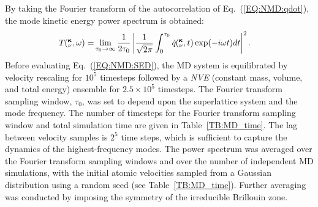 \documentclass[aps,prb,preprint,preprintnumbers,amsmath,amssymb,floatfix,superscriptaddress]{revtex4}
\newcommand{\kvt}{\mspace{-4.0mu}\left(\mspace{-8.0mu}
\begin{smallmatrix}&\pmb{\kappa} \\&\nu\end{smallmatrix}
\mspace{-2.0mu},t\right)}
\newcommand{\kvw}{\mspace{-4.0mu}\left(\mspace{-8.0mu}
\begin{smallmatrix}&\pmb{\kappa} \\&\nu\end{smallmatrix}
\mspace{-2.0mu},\omega\right)}
\begin{document}
By taking the Fourier transform of the autocorrelation of Eq.~(\ref{EQ:NMD:qdot}), the mode kinetic energy power spectrum is obtained: \cite{dove_introduction_1993-3}
\begin{equation}\label{EQ:NMD:SED}
\begin{split}
T\kvw=&\lim_{\tau_0\rightarrow\infty}\frac{1}{2\tau_0}\left|\frac{1}{\sqrt{2\pi}}\int_{0}^{\tau_0}\dot{q}\kvt\exp(-i\omega t)dt\right|^2.
\end{split}
\end{equation}
Before evaluating Eq.~(\ref{EQ:NMD:SED}), the MD system is equilibrated by velocity rescaling for $10^5$ timesteps followed by a \textit{NVE} (constant mass, volume, and total energy) ensemble for $2.5 \times10^5$ timesteps. The Fourier transform sampling window, $\tau_0$, was set to depend upon the superlattice system and the mode frequency. The number of timesteps for the Fourier transform sampling window and total simulation time are given in Table~\ref{TB:MD_time}. The lag between velocity samples is $2^5$ time steps, which is sufficient to capture the dynamics of the highest-frequency modes. The power spectrum was averaged over the Fourier transform sampling windows and over the number of independent MD simulations, with the initial atomic velocities sampled from a Gaussian distribution using a random seed (see Table~\ref{TB:MD_time}). Further averaging was conducted by imposing the symmetry of the irreducible Brillouin zone. 
\end{document}
